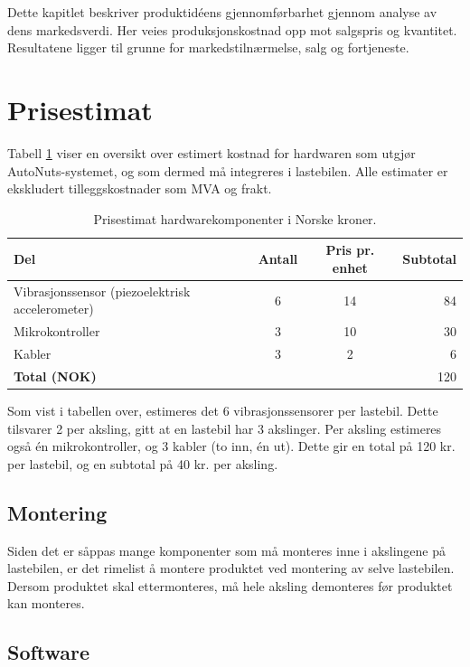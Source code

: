 Dette kapitlet beskriver produktidéens gjennomførbarhet gjennom analyse av 
dens markedsverdi. Her veies produksjonskostnad opp mot salgspris og kvantitet.
Resultatene ligger til grunne for markedstilnærmelse, salg og fortjeneste.

\section{Prisestimat}
Tabell \ref{tab:price-HW} viser en oversikt over estimert kostnad for 
hardwaren som utgjør AutoNuts-systemet, og som dermed må integreres i lastebilen. Alle estimater er ekskludert tilleggskostnader som MVA og frakt.

\begin{table}[H]
\caption{Prisestimat hardwarekomponenter i Norske kroner.}
\label{tab:price-HW}
\begin{tabularx}{\textwidth}{lcc|r}
	{\bf Del} & {\bf Antall} & {\bf Pris pr. enhet} & {\bf Subtotal}\\
	\hline
	Vibrasjonssensor (piezoelektrisk accelerometer) & 6 & 14 & 84\\
	Mikrokontroller & 3 & 10 & 30\\
	Kabler & 3 & 2 & 6\\
	\hline
	\multicolumn{3}{l}{{\bf Total (NOK)}} &\multicolumn{1}{r}{120}\\
	\hline \hline
\end{tabularx}
\end{table}

Som vist i tabellen over, estimeres det 6 vibrasjonssensorer per lastebil. Dette
tilsvarer 2 per aksling, gitt at en lastebil har 3 akslinger. Per aksling 
estimeres også én mikrokontroller, og 3 kabler (to inn, én ut). Dette gir en 
total på 120 kr. per lastebil, og en subtotal på 40 kr. per aksling.

\subsection{Montering}
Siden det er såppas mange komponenter som må monteres inne i akslingene på 
lastebilen, er det rimelist å montere produktet ved montering av selve 
lastebilen. Dersom produktet skal ettermonteres, må hele aksling demonteres 
før produktet kan monteres. 

\subsection{Software}


